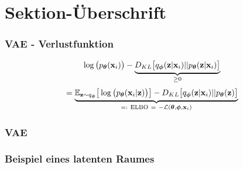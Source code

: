 

\author[Sebastian Hahn]{Nix}


\beamertemplatenavigationsymbolsempty{}



\section{Sektion-Überschrift}

\begin{frame}
	\frametitle{VAE - Verlustfunktion}
	\begin{align*}
	\log\big(p_{\boldsymbol\theta}(\mathbf{x}_i)\big) - \underbrace{D_{KL}\big[q_{\boldsymbol\phi}(\mathbf{z}|\mathbf{x}_i) || p_{\boldsymbol\theta}(\mathbf{z}|\mathbf{x}_i)\big]}_{\ge 0}
	\end{align*}
	\begin{align*}
	=\underbrace{ \E_{\z\sim q_{\boldsymbol\phi}}\big[\log\big(\pdec\big)\big] - D_{KL}\big[\qenc||p_{\boldsymbol\theta}(\z)\big]}_{=:\ \mathrm{ELBO}\ =\ -\mathcal{L}(\boldsymbol\theta,\boldsymbol\phi,\mathbf{x}_i)}
	\end{align*}
\end{frame}

\begin{frame}
	\frametitle{VAE}
	\begin{figure}
	\end{figure}
\end{frame}

\begin{frame}
	\frametitle{Beispiel eines latenten Raumes}
	
	\begin{figure}[h!]
		\centering
		\begin{minipage}{.6\textwidth}
		\end{minipage}%
		\begin{minipage}{.5\textwidth}
		\end{minipage}
	\end{figure}
\end{frame}
